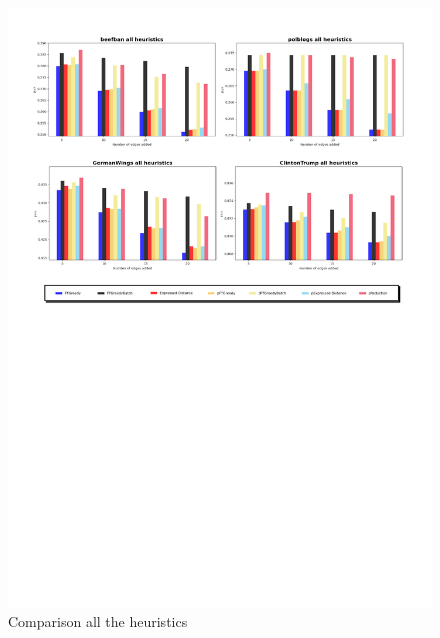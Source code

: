 \begin{figure}[!htbp]
	\begin{center}
	\advance\leftskip-1.3cm
	\captionsetup{justification=centering,margin=2cm}
	\includegraphics[width=1.2\textwidth]{Figures/all2}
	\caption{Comparison all the heuristics}
	\end{center}
	\label{all2}
\end{figure}







